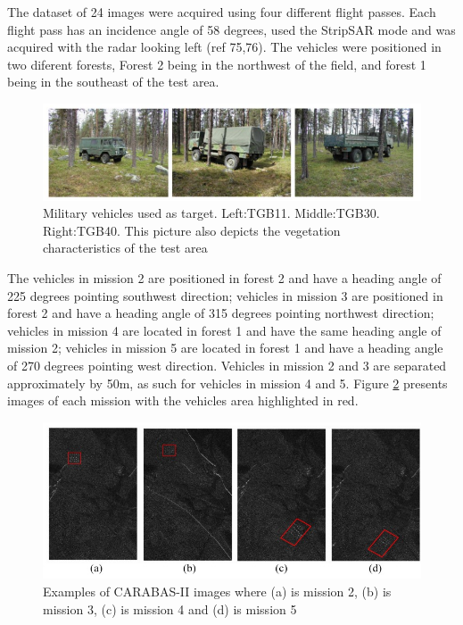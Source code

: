 The dataset of 24 images were acquired using four different flight passes. Each 
flight pass has an incidence angle of 58 degrees, used the StripSAR mode and was acquired with the radar looking left (ref 75,76).
The vehicles were positioned in two diferent forests, Forest 2 being in the northwest of the field, and forest 1 being in the
southeast of the test area. 

\begin{figure}[h]
    \centering
    \includegraphics{chapter6/carabas_vehicles_fisico.jpg}
    \caption{Military vehicles used as target. Left:TGB11. Middle:TGB30. Right:TGB40. 
    This picture also depicts the vegetation characteristics of the test area}
    \label{fig:veiculos}
\end{figure}

The vehicles in mission 2 are positioned in forest 2 and have a heading angle of 225 degrees pointing southwest direction;
vehicles in mission 3 are positioned in forest 2 and have a heading angle of 315 degrees pointing northwest direction;
vehicles in mission 4 are located in forest 1 and have the same heading angle of mission 2;
vehicles in mission 5 are located in forest 1 and have a heading angle of 270 degrees pointing west direction.
Vehicles in mission 2 and 3 are separated approximately by 50m, as such for vehicles in mission 4 and 5.
Figure \ref{fig:carabas_vehicles} presents images of each mission with the vehicles area highlighted in red.

\begin{figure}[h]
    \centering
    \includegraphics{chapter6/carabas_vehicles.jpg}
    \caption{Examples of CARABAS-II images where (a) is mission 2, (b) is mission 3, (c) is mission 4 and (d)
    is mission 5}
    \label{fig:carabas_vehicles}
\end{figure}

